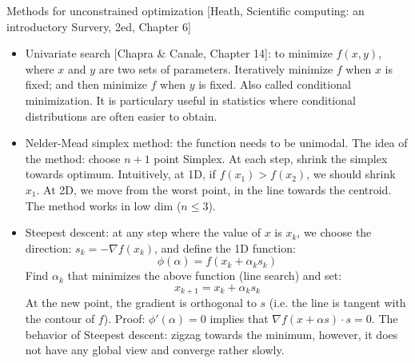 \documentclass{report}
\begin{document}
Methods for unconstrained optimization [Heath, Scientific computing: an introductory Survery, 2ed, Chapter 6]
\begin{itemize}
\item Univariate search [Chapra \& Canale, Chapter 14]: to minimize $f(x,y)$, where $x$ and $y$ are two sets of parameters. Iteratively minimize $f$ when $x$ is fixed; and then minimize $f$ when $y$ is fixed. Also called conditional minimization. It is particulary useful in statistics where conditional distributions are often easier to obtain. 
	
\item Nelder-Mead simplex method: the function needs to be unimodal. The idea of the method: choose $n+1$ point Simplex. At each step, shrink the simplex towards optimum. Intuitively, at 1D, if $f(x_1) > f(x_2)$, we should shrink $x_1$. At 2D, we move from the worst point, in the line towards the centroid. The method works in low dim ($n \leq 3$). 

\item Steepest descent: at any step where the value of $x$ is $x_k$, we choose the direction: $s_k = -\nabla f(x_k)$, and define the 1D function: 
\begin{equation}
\phi(\alpha) = f(x_k + \alpha_k s_k)	
\end{equation}
Find $\alpha_k$ that minimizes the above function (line search) and set: 
\begin{equation}
x_{k+1} = x_k + \alpha_k s_k	
\end{equation}
At the new point, the gradient is orthogonal to $s$ (i.e. the line is tangent with the contour of $f$). Proof: $\phi'(\alpha) = 0$ implies that $\nabla f(x + \alpha s) \cdot s = 0$. The behavior of Steepest descent: zigzag towards the minimum, however, it does not have any global view and converge rather slowly. 


\end{itemize}
\end{document}
